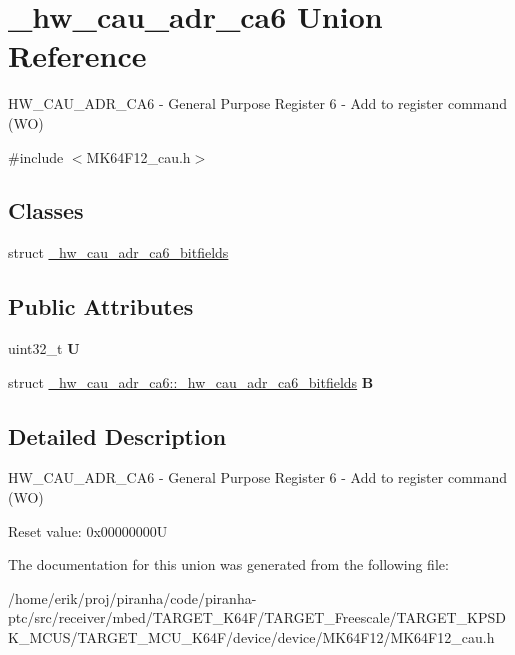 \hypertarget{union__hw__cau__adr__ca6}{}\section{\+\_\+hw\+\_\+cau\+\_\+adr\+\_\+ca6 Union Reference}
\label{union__hw__cau__adr__ca6}


H\+W\+\_\+\+C\+A\+U\+\_\+\+A\+D\+R\+\_\+\+C\+A6 -\/ General Purpose Register 6 -\/ Add to register command (WO)  




{\ttfamily \#include $<$M\+K64\+F12\+\_\+cau.\+h$>$}

\subsection*{Classes}
\begin{DoxyCompactItemize}
\item 
struct \hyperlink{struct__hw__cau__adr__ca6_1_1__hw__cau__adr__ca6__bitfields}{\+\_\+hw\+\_\+cau\+\_\+adr\+\_\+ca6\+\_\+bitfields}
\end{DoxyCompactItemize}
\subsection*{Public Attributes}
\begin{DoxyCompactItemize}
\item 
uint32\+\_\+t {\bfseries U}\hypertarget{union__hw__cau__adr__ca6_a50cb44f9192c674ca92d897e837ef1a5}{}\label{union__hw__cau__adr__ca6_a50cb44f9192c674ca92d897e837ef1a5}

\item 
struct \hyperlink{struct__hw__cau__adr__ca6_1_1__hw__cau__adr__ca6__bitfields}{\+\_\+hw\+\_\+cau\+\_\+adr\+\_\+ca6\+::\+\_\+hw\+\_\+cau\+\_\+adr\+\_\+ca6\+\_\+bitfields} {\bfseries B}\hypertarget{union__hw__cau__adr__ca6_a796beb67b027b8edb5cb1f5e9cfb50c5}{}\label{union__hw__cau__adr__ca6_a796beb67b027b8edb5cb1f5e9cfb50c5}

\end{DoxyCompactItemize}


\subsection{Detailed Description}
H\+W\+\_\+\+C\+A\+U\+\_\+\+A\+D\+R\+\_\+\+C\+A6 -\/ General Purpose Register 6 -\/ Add to register command (WO) 

Reset value\+: 0x00000000U 

The documentation for this union was generated from the following file\+:\begin{DoxyCompactItemize}
\item 
/home/erik/proj/piranha/code/piranha-\/ptc/src/receiver/mbed/\+T\+A\+R\+G\+E\+T\+\_\+\+K64\+F/\+T\+A\+R\+G\+E\+T\+\_\+\+Freescale/\+T\+A\+R\+G\+E\+T\+\_\+\+K\+P\+S\+D\+K\+\_\+\+M\+C\+U\+S/\+T\+A\+R\+G\+E\+T\+\_\+\+M\+C\+U\+\_\+\+K64\+F/device/device/\+M\+K64\+F12/M\+K64\+F12\+\_\+cau.\+h\end{DoxyCompactItemize}
